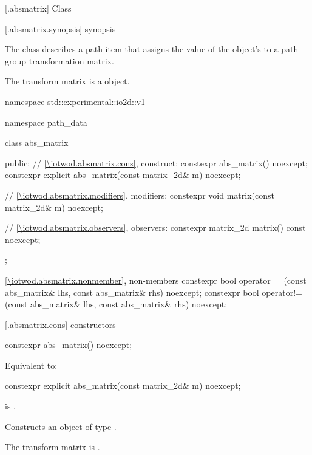  [\iotwod.absmatrix] {Class }%

 [\iotwod.absmatrix.synopsis] { synopsis}%

\pnum
{}%
The class  describes a path item that assigns the value of the  object's  to a path group transformation matrix.

\pnum
The transform matrix is a  object.

\begin{codeblock}
namespace std::experimental::io2d::v1 {
  namespace path_data {
    class abs_matrix {
    public:
      // \ref{\iotwod.absmatrix.cons}, construct:
      constexpr abs_matrix() noexcept;
      constexpr explicit abs_matrix(const matrix_2d& m) noexcept;

      // \ref{\iotwod.absmatrix.modifiers}, modifiers:
      constexpr void matrix(const matrix_2d& m) noexcept;

      // \ref{\iotwod.absmatrix.observers}, observers:
      constexpr matrix_2d matrix() const noexcept;
    };
    
    \ref{\iotwod.absmatrix.nonmember}, non-members
    constexpr bool operator==(const abs_matrix& lhs, const abs_matrix& rhs) 
      noexcept;
    constexpr bool operator!=(const abs_matrix& lhs, const abs_matrix& rhs) 
      noexcept;
  }
}
\end{codeblock}

 [\iotwod.absmatrix.cons] { constructors}

%
\begin{itemdecl}
constexpr abs_matrix() noexcept;
\end{itemdecl}
\begin{itemdescr}
\pnum
\effects
Equivalent to: 
\end{itemdescr}

%
\begin{itemdecl}
constexpr explicit abs_matrix(const matrix_2d& m) noexcept;
\end{itemdecl}
\begin{itemdescr}
\pnum
\requires
{} is .

\pnum
\effects
Constructs an object of type .

\pnum
The transform matrix is .
\end{itemdescr}

